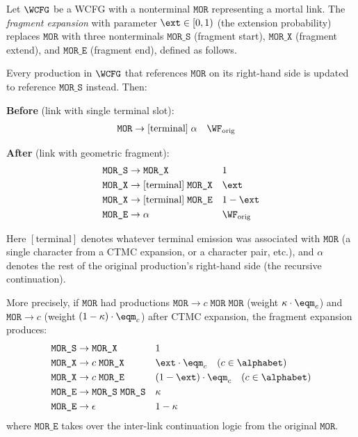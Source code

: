 \begin{definition}
\label{def:fragment-appendix}
Let $\WCFG$ be a WCFG with a nonterminal $\texttt{MOR}$ representing
a mortal link.  The \emph{fragment expansion} with parameter
$\ext \in [0,1)$ (the extension probability) replaces $\texttt{MOR}$
with three nonterminals $\texttt{MOR\_S}$ (fragment start),
$\texttt{MOR\_X}$ (fragment extend), and $\texttt{MOR\_E}$
(fragment end), defined as follows.

Every production in $\WCFG$ that references $\texttt{MOR}$
on its right-hand side is updated to reference $\texttt{MOR\_S}$ instead.
Then:

\medskip
\noindent\textbf{Before} (link with single terminal slot):
\begin{align*}
\texttt{MOR} &\to [\text{terminal}]\;\alpha && \WF_{\text{orig}}
\end{align*}

\noindent\textbf{After} (link with geometric fragment):
\begin{align*}
\texttt{MOR\_S} &\to \texttt{MOR\_X} && 1 \\
\texttt{MOR\_X} &\to [\text{terminal}]\;\texttt{MOR\_X} && \ext \\
\texttt{MOR\_X} &\to [\text{terminal}]\;\texttt{MOR\_E} && 1 - \ext \\
\texttt{MOR\_E} &\to \alpha && \WF_{\text{orig}}
\end{align*}

Here $[\text{terminal}]$ denotes whatever terminal emission was
associated with $\texttt{MOR}$ (a single character from a CTMC expansion,
or a character pair, etc.), and $\alpha$ denotes the rest of the
original production's right-hand side (the recursive continuation).

More precisely, if $\texttt{MOR}$ had productions
$\texttt{MOR} \to c\;\texttt{MOR}\;\texttt{MOR}$ (weight $\kappa \cdot \eqm_c$)
and $\texttt{MOR} \to c$ (weight $(1-\kappa) \cdot \eqm_c$)
after CTMC expansion, the fragment expansion produces:
\begin{align*}
\texttt{MOR\_S} &\to \texttt{MOR\_X} && 1 \\
\texttt{MOR\_X} &\to c\;\texttt{MOR\_X} && \ext \cdot \eqm_c \quad (c \in \alphabet) \\
\texttt{MOR\_X} &\to c\;\texttt{MOR\_E} && (1-\ext) \cdot \eqm_c \quad (c \in \alphabet) \\
\texttt{MOR\_E} &\to \texttt{MOR\_S}\;\texttt{MOR\_S} && \kappa \\
\texttt{MOR\_E} &\to \epsilon && 1-\kappa
\end{align*}
where $\texttt{MOR\_E}$ takes over the inter-link continuation logic
from the original $\texttt{MOR}$.
\end{definition}

